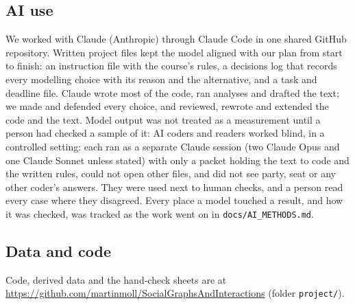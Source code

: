 \documentclass[9pt,twocolumn,twoside]{pnas-new}
\begin{document}
{\subsection*{AI use}
We worked with Claude (Anthropic) through Claude Code in one shared GitHub repository. Written project files kept the
model aligned with our plan from start to finish: an instruction file with the course's rules, a decisions log that
records every modelling choice with its reason and the alternative, and a task and deadline file. Claude wrote most of
the code, ran analyses and drafted the text; we made and defended every choice, and reviewed, rewrote and extended the
code and the text. Model output was not treated as a measurement until a person had checked a sample of it: AI coders
and readers worked blind, in a controlled setting: each ran as a separate Claude session (two Claude Opus and one
Claude Sonnet unless stated) with only a packet holding the text to code and the written rules, could not open other
files, and did not see party, seat or any other coder's answers. They were used next to human checks, and a person
read every case where they disagreed. Every place a model
touched a result, and how it was checked, was tracked as the work went on in \texttt{docs/AI\_METHODS.md}.

\subsection*{Data and code}
Code, derived data and the hand-check sheets are at \url{https://github.com/martinmoll/SocialGraphsAndInteractions}
(folder \texttt{project/}).
}

\showmatmethods{}



\clearpage
\end{document}
